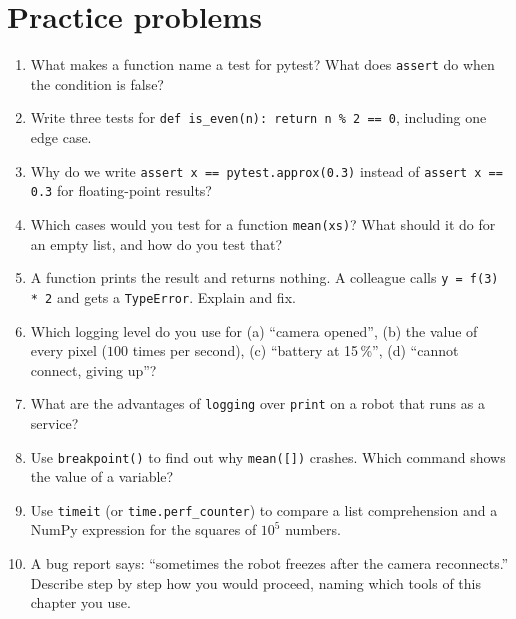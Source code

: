 \section*{Practice problems}
\begin{enumerate}[label=\textbf{\thechapter.\arabic*}]
  \item What makes a function name a test for pytest? What does \texttt{assert} do when the condition is false?
  \item Write three tests for \verb!def is_even(n): return n % 2 == 0!, including one edge case.
  \item Why do we write \verb!assert x == pytest.approx(0.3)! instead of \verb!assert x == 0.3! for floating-point results?
  \item Which cases would you test for a function \texttt{mean(xs)}? What should it do for an empty list, and how do you test that?
  \item A function prints the result and returns nothing. A colleague calls \verb!y = f(3) * 2! and gets a \texttt{TypeError}. Explain and fix.
  \item Which logging level do you use for (a) ``camera opened'', (b) the value of every pixel ($100$ times per second), (c) ``battery at 15\,\%'', (d) ``cannot connect, giving up''?
  \item What are the advantages of \texttt{logging} over \texttt{print} on a robot that runs as a service?
  \item Use \texttt{breakpoint()} to find out why \verb!mean([])! crashes. Which command shows the value of a variable?
  \item Use \texttt{timeit} (or \texttt{time.perf\_counter}) to compare a list comprehension and a NumPy expression for the squares of $10^5$ numbers.
  \item[\textbf{\thechapter.10}$\star$] A bug report says: ``sometimes the robot freezes after the camera reconnects.'' Describe step by step how you would proceed, naming which tools of this chapter you use.
\end{enumerate}
